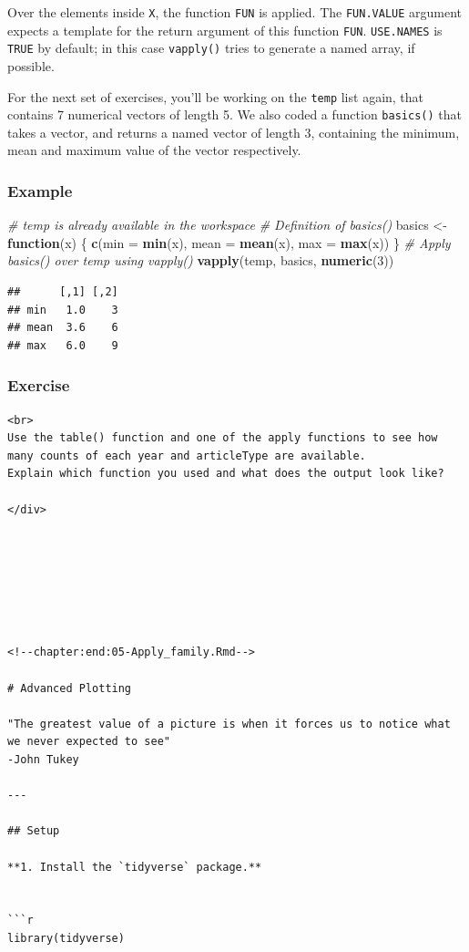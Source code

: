\documentclass[
]{book}
\newenvironment{Shaded}{\begin{snugshade}}{\end{snugshade}}
\newcommand{\CommentTok}[1]{\textcolor[rgb]{0.56,0.35,0.01}{\textit{#1}}}
\newcommand{\ControlFlowTok}[1]{\textcolor[rgb]{0.13,0.29,0.53}{\textbf{#1}}}
\newcommand{\DataTypeTok}[1]{\textcolor[rgb]{0.13,0.29,0.53}{#1}}
\newcommand{\DecValTok}[1]{\textcolor[rgb]{0.00,0.00,0.81}{#1}}
\newcommand{\KeywordTok}[1]{\textcolor[rgb]{0.13,0.29,0.53}{\textbf{#1}}}
\newcommand{\NormalTok}[1]{#1}
\newcommand{\StringTok}[1]{\textcolor[rgb]{0.31,0.60,0.02}{#1}}
\begin{document}
Over the elements inside \texttt{X}, the function \texttt{FUN} is applied. The \texttt{FUN.VALUE} argument expects a template for the return argument of this function \texttt{FUN}. \texttt{USE.NAMES} is \texttt{TRUE} by default; in this case \texttt{vapply()} tries to generate a named array, if possible.

For the next set of exercises, you'll be working on the \texttt{temp} list again, that contains 7 numerical vectors of length 5. We also coded a function \texttt{basics()} that takes a vector, and returns a named vector of length 3, containing the minimum, mean and maximum value of the vector respectively.

\hypertarget{example-6}{%
\subsubsection{Example}\label{example-6}}

\begin{Shaded}
\begin{Highlighting}[]
\CommentTok{# temp is already available in the workspace}
\CommentTok{# Definition of basics()}
\NormalTok{basics <-}\StringTok{ }\ControlFlowTok{function}\NormalTok{(x) \{}
  \KeywordTok{c}\NormalTok{(}\DataTypeTok{min =} \KeywordTok{min}\NormalTok{(x), }\DataTypeTok{mean =} \KeywordTok{mean}\NormalTok{(x), }\DataTypeTok{max =} \KeywordTok{max}\NormalTok{(x))}
\NormalTok{\}}
\CommentTok{# Apply basics() over temp using vapply()}
\KeywordTok{vapply}\NormalTok{(temp, basics, }\KeywordTok{numeric}\NormalTok{(}\DecValTok{3}\NormalTok{))}
\end{Highlighting}
\end{Shaded}

\begin{verbatim}
##      [,1] [,2]
## min   1.0    3
## mean  3.6    6
## max   6.0    9
\end{verbatim}

\hypertarget{exercise-5}{%
\subsubsection{Exercise}\label{exercise-5}}

\begin{verbatim}
<br>
Use the table() function and one of the apply functions to see how many counts of each year and articleType are available. 
Explain which function you used and what does the output look like?

</div>







<!--chapter:end:05-Apply_family.Rmd-->

# Advanced Plotting 

"The greatest value of a picture is when it forces us to notice what we never expected to see"
-John Tukey

---

## Setup

**1. Install the `tidyverse` package.**


```r
library(tidyverse)
\end{verbatim}
\end{document}
